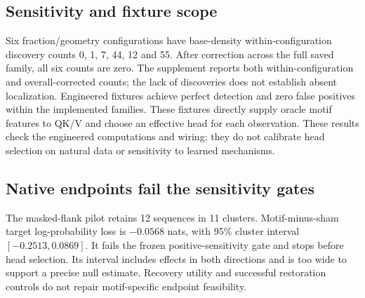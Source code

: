 \documentclass[unnumsec,webpdf,modern,large,namedate]{oup-authoring-template}
\begin{document}
\subsection{Sensitivity and fixture scope}
Six fraction/geometry configurations have base-density within-configuration discovery counts 0, 1, 7, 44, 12 and 55. After correction across the full saved family, all six counts are zero. The supplement reports both within-configuration and overall-corrected counts; the lack of discoveries does not establish absent localization. Engineered fixtures achieve perfect detection and zero false positives within the implemented families. These fixtures directly supply oracle motif features to QK/V and choose an effective head for each observation. These results check the engineered computations and wiring; they do not calibrate head selection on natural data or sensitivity to learned mechanisms.
\subsection{Native endpoints fail the sensitivity gates}
The masked-flank pilot retains 12 sequences in 11 clusters. Motif-minus-sham target log-probability loss is $-0.0568$ nats, with 95\% cluster interval $[-0.2513,0.0869]$. It fails the frozen positive-sensitivity gate and stops before head selection. Its interval includes effects in both directions and is too wide to support a precise null estimate. Recovery utility and successful restoration controls do not repair motif-specific endpoint feasibility.
\end{document}
